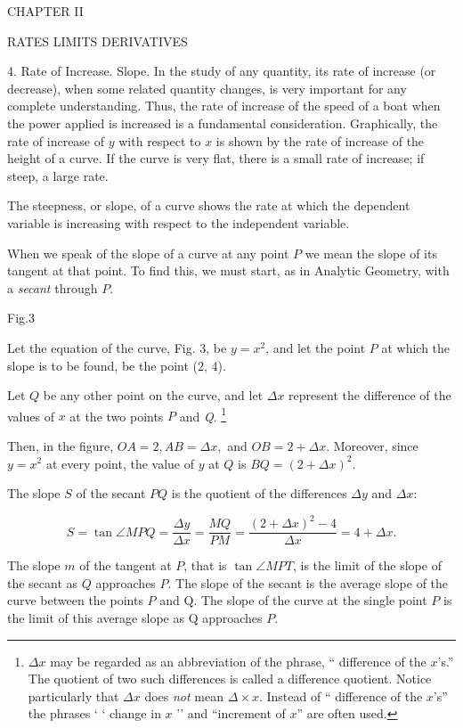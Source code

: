 \documentclass[12pt]{article}
\begin{document}
CHAPTER II
\begin{center}
RATES LIMITS DERIVATIVES
\end{center}

4. Rate of Increase.
Slope. In the study of any quantity,
its rate of increase (or decrease), when some related quantity
changes, is very important for any complete understanding.
Thus, the rate of increase of the speed of a boat when the
power applied is increased is a fundamental consideration.
Graphically, the rate of increase of $y$ with respect to $x$ is
shown by the rate of increase of the height
of a curve. If the curve is very flat, there
is a small rate of increase; if steep, a large
rate.

The steepness, or slope, of a curve shows
the rate at which the dependent variable is
increasing with respect to the independent
variable.

When we speak of the slope of a curve
at any point $P$ we mean the slope of its tangent 
at that point. To find this, we must
start, as in Analytic Geometry, with a {\it secant}
through $P$.

Fig.3

Let the equation of the curve, Fig. 3, be
$ y=x^2$, and let the point $P$ at which the slope is to be found, be
the point (2, 4).

Let $Q$ be any other point on the curve, and let $\Delta x$ represent
the difference of the values of $x$ at the two points $P$ and {\it Q}.
\footnote{$\Delta x$ may be regarded as an abbreviation of the phrase, 
`` difference of the
$x$'s.'' The quotient of two such differences is called a difference quotient.
Notice particularly that $\Delta x$ does {\it not} mean $\Delta\times x$. 
Instead of `` difference of
the $x$'s'' the phrases ` ` change in $x$ '' and ``increment of $x$'' are often used.}

Then, in the figure, $OA=2, AB=\Delta x,$ and $OB=2+\Delta x$.
Moreover, since $y=x^{2}$ at every point, the value of $y$ at $Q$ is
$BQ=(2+\Delta x)^{2}$.

The slope $S$ of the secant $PQ$ is the quotient of the 
differences $\Delta y$ and $\Delta x$:

$$S= \tan\angle MPQ=\frac{\Delta y}{\Delta x}=\frac{MQ}{PM}=
\frac{(2+\Delta x)^{2}-4}{\Delta x}=4+\Delta x.$$

The slope $m$ of the tangent at $P$, that is $\tan\angle MPT$, is the
limit of the slope of the secant as $Q$ approaches $P$.
The slope of the secant is the average slope of the curve between the points
$P$ and Q. The slope of the curve at the single point $P$ is the limit of this
average slope as $\mathrm{Q}$ approaches $P$.
\end{document}
